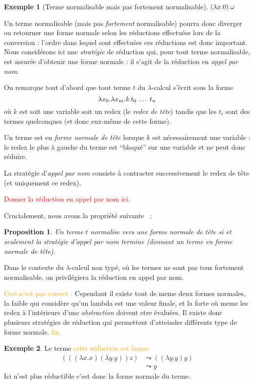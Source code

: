\documentclass {article}
\newtheorem{proposition}{Proposition}
\theoremstyle{definition}
\newtheorem{example}{Exemple}
\theoremstyle{remark}
\newcommand{\todo}[1]{\textcolor{red}{#1}}
\newcommand{\attention}[1]{\textcolor{orange}{#1}}
\begin{document}
\begin{example}[Terme normalisable mais pas fortement normalisable]
  \todo{\((\lambda x. 0)\:\omega\)}
\end{example}

Un terme normalisable (mais pas \emph{fortement} normalisable) pourra
donc diverger ou retourner une forme normale selon les réductions
effectuées lors de la conversion : l'ordre dans lequel sont effectuées
ces réductions est donc important. Nous considérons ici une
\emph{stratégie} de réduction qui, pour tout terme normalisable, est assurée d'obtenir une forme
normale : il s'agit de la réduction en
\emph{appel par nom}.

On remarque tout d'abord que tout terme \(t\) du \(\lambda\)-calcul
s'écrit sous la forme
%
\[
\lambda x_0. \lambda x_m. k\:t_0\:\ldots\:t_n
\]
%
où \(k\) est soit une variable soit un redex (le \emph{redex de tête})
tandis que les \(t_i\) sont des termes quelconques (et donc eux-même
de cette forme).


Un terme est en \emph{forme normale de tête} lorsque \(k\) est
nécessairement une variable : le redex le plus à gauche du terme est
``bloqué'' sur une variable et ne peut donc réduire.

La stratégie d'\emph{appel par nom} consiste à contracter
successivement le redex de tête (et uniquement ce redex). 

\todo{Donner la réduction en appel par nom ici.}

Crucialement, nous avons la propriété suivante~\citep[th.3,
  p.62]{krivine:lambda-calculus} :
%
\begin{proposition}
  Un terme \(t\) normalise vers une forme normale de tête si et
  seulement la stratégie d'appel par nom termine (donnant un terme en
  forme normale de tête).
\end{proposition}

Dans le contexte du \(\lambda\)-calcul non typé, où les termes ne sont
pas tous fortement normalisable, on privilégiera la réduction en appel
par nom.

\attention{Ceci n'est pas correct :} Cependant il
existe tout de meme deux formes normales, la faible qui considère
qu'un lambda est une valeur finale, et la forte où meme les redex à
l'intérieure d'une \emph{abstraction} doivent etre évaluées.  Il
existe donc plusieurs stratégies de réduction qui permettent
d'atteindre différents type de forme normale. \attention{fin.}

\begin{example}
  Le terme \attention{cette réduction est fausse}
  \begin{align*}
    (((\lambda x.x) (\lambda y.y)) z) &\leadsto ((\lambda y.y) y) \\
    & \leadsto y
  \end{align*}
  Ici  n'est plus réductible c'est donc la forme normale du terme.
\end{example}
\end{document}
